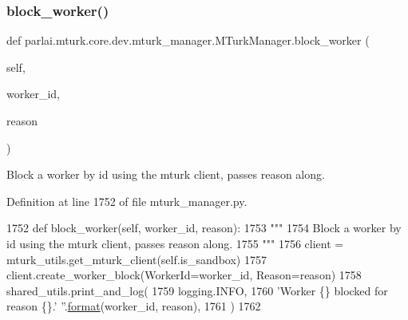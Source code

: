 \subsubsection{\texorpdfstring{block\+\_\+worker()}{block\_worker()}}
{\footnotesize\ttfamily def parlai.\+mturk.\+core.\+dev.\+mturk\+\_\+manager.\+M\+Turk\+Manager.\+block\+\_\+worker (\begin{DoxyParamCaption}\item[{}]{self,  }\item[{}]{worker\+\_\+id,  }\item[{}]{reason }\end{DoxyParamCaption})}

\begin{DoxyVerb}Block a worker by id using the mturk client, passes reason along.
\end{DoxyVerb}
 

Definition at line 1752 of file mturk\+\_\+manager.\+py.


\begin{DoxyCode}
1752     \textcolor{keyword}{def }block\_worker(self, worker\_id, reason):
1753         \textcolor{stringliteral}{"""}
1754 \textcolor{stringliteral}{        Block a worker by id using the mturk client, passes reason along.}
1755 \textcolor{stringliteral}{        """}
1756         client = mturk\_utils.get\_mturk\_client(self.is\_sandbox)
1757         client.create\_worker\_block(WorkerId=worker\_id, Reason=reason)
1758         shared\_utils.print\_and\_log(
1759             logging.INFO,
1760             \textcolor{stringliteral}{'Worker \{\} blocked for reason \{\}.'} \textcolor{stringliteral}{''}.\hyperlink{namespaceparlai_1_1chat__service_1_1services_1_1messenger_1_1shared__utils_a32e2e2022b824fbaf80c747160b52a76}{format}(worker\_id, reason),
1761         )
1762 
\end{DoxyCode}
\mbox{\label{classparlai_1_1mturk_1_1core_1_1dev_1_1mturk__manager_1_1MTurkManager_ab6e93169cded3f12f6d5f509de7dc64b}} 
